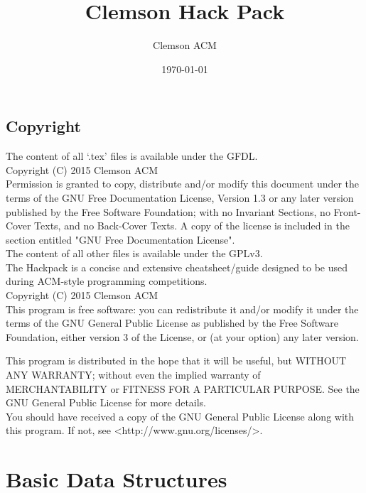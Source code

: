 \documentclass[letterpaper, 10pt]{report}
\title{Clemson Hack Pack}
\author{Clemson ACM}
\date{\today}
\begin{document}
\maketitle

\section*{Copyright}
The content of all `.tex' files is available under the GFDL. \\
Copyright (C)  2015  Clemson ACM \\
Permission is granted to copy, distribute and/or modify this document
under the terms of the GNU Free Documentation License, Version 1.3
or any later version published by the Free Software Foundation;
with no Invariant Sections, no Front-Cover Texts, and no Back-Cover Texts.
A copy of the license is included in the section entitled "GNU
Free Documentation License".\\

The content of all other files is available under the GPLv3. \\
The Hackpack is a concise and extensive cheatsheet/guide designed to be used during ACM-style programming competitions. \\
Copyright (C)  2015  Clemson ACM \\

This program is free software: you can redistribute it and/or modify
it under the terms of the GNU General Public License as published by
the Free Software Foundation, either version 3 of the License, or
(at your option) any later version.

This program is distributed in the hope that it will be useful,
but WITHOUT ANY WARRANTY; without even the implied warranty of
MERCHANTABILITY or FITNESS FOR A PARTICULAR PURPOSE\@. See the
GNU General Public License for more details. \\

You should have received a copy of the GNU General Public License
along with this program. If not, see <http://www.gnu.org/licenses/>.


\break



\tableofcontents

\chapter{Basic Data Structures}




\end{document}
